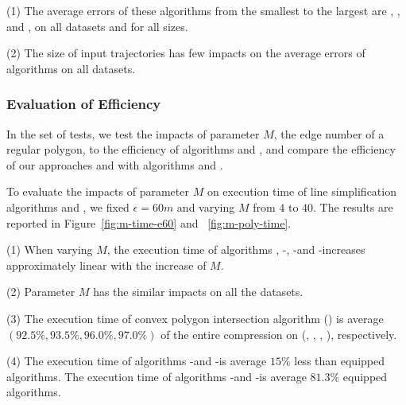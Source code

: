 \ni(1) The average errors of these algorithms from the smallest to the largest are \squishe, \dps, \cist and \cista, on all datasets and for all sizes. %

\ni(2) The size of input trajectories has few impacts on the average errors of \lsa algorithms on all datasets.




\subsubsection{Evaluation of Efficiency}


In the set of tests, we test the impacts of parameter $M$, \ie the edge number of a regular polygon, to the efficiency of algorithms \cist and \cista, and compare the efficiency of our approaches \cist and \cista with algorithms \dps and \squishe.
%





To evaluate the impacts of parameter $M$ on execution time of line simplification algorithms \cist and \cista, we fixed $\epsilon =60m$ and varying $M$ from $4$ to $40$.
%
The results are reported in Figure~\ref{fig:m-time-e60} and ~\ref{fig:m-poly-time}.

\ni(1) When varying $M$, the execution time of algorithms \cist, \cist-\cpia, \cista-\rpia and \cista-\cpia increases approximately linear with the increase of $M$.

\ni(2) Parameter $M$ has the similar impacts on all the datasets.

\ni(3) The execution time of convex polygon intersection algorithm (\cpia) is average \textcolor[rgb]{1.00,0.00,0.00}{$(92.5\%, 93.5\%, 96.0\%, 97.0\%)$} of the entire compression on (\truck, \sercar, \geolife, \pricar), respectively.

\ni(4) The execution time of algorithms \cist-\rpia and \cista-\rpia is average \textcolor[rgb]{1.00,0.00,0.00}{$15\%$} less than \cpia equipped algorithms.
The execution time of algorithms \cist-\rpia and \cista-\rpia is average \textcolor[rgb]{1.00,0.00,0.00}{$81.3\%$} \cpia equipped algorithms.

